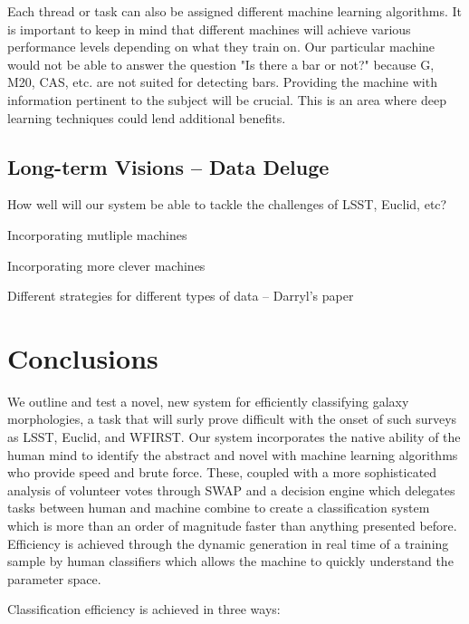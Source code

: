 \documentclass[twocolumn]{aastex6}
\begin{document}
Each thread or task can also be assigned different machine learning algorithms. 
It is important to keep in mind that different machines will achieve various 
performance levels depending on what they train on. Our particular machine would
not be able to answer the question "Is there a bar or not?" because G, M20, CAS, etc.
are not suited for detecting bars. Providing the machine with information 
pertinent to the subject will be crucial. This is an area where deep learning 
techniques could lend additional benefits. 

\subsection{Long-term Visions -- Data Deluge}

How well will our system be able to tackle the challenges of LSST, Euclid, etc? 

Incorporating mutliple machines

Incorporating more clever machines

Different strategies for different types of data -- Darryl's paper 


\section{Conclusions}

We outline and test a novel, new system for efficiently classifying galaxy morphologies, 
a task that will surly prove difficult with the onset of such surveys as LSST, Euclid, 
and WFIRST. Our system incorporates the native ability of the human mind to identify
the abstract and novel with machine learning algorithms who provide speed and 
brute force. These, coupled with a more sophisticated analysis of volunteer votes 
through SWAP and a decision engine which delegates tasks between human and 
machine combine to create a classification system which is more than an order of
magnitude faster than anything presented before. Efficiency is achieved through 
the dynamic generation in real time of a training sample by human classifiers which
allows the machine to quickly understand the parameter space. 

Classification efficiency is achieved in three ways: 
\end{document}
